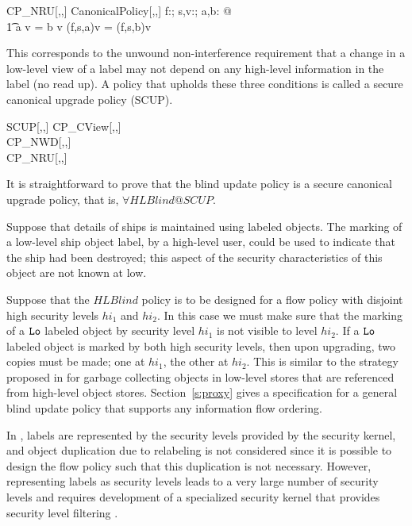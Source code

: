 \begin{schema}{CP\_NRU[\LEVEL,\LABEL,\FID]}
CanonicalPolicy[\LEVEL,\LABEL,\FID]
\where
\forall f:\FID ; s,v:\LEVEL; a,b: \LABEL @\\
\t1 a \lproj v = b \lproj v \implies \Rfun(f,s,a)\lproj v = \Rfun(f,s,b)\lproj v
\end{schema}
This corresponds to the unwound non-interference requirement
that a change in a low-level view of a label may not depend on 
any high-level information in the label (no read up). 
A policy that upholds these three conditions is called
a secure canonical upgrade policy (SCUP).
\begin{schema}{SCUP[\LEVEL,\LABEL,\FID]}
CP\_CView[\LEVEL,\LABEL,\FID]\\
CP\_NWD[\LEVEL,\LABEL,\FID] \\
CP\_NRU[\LEVEL,\LABEL,\FID]
\end{schema}

\begin{ex}
It is straightforward to prove that the blind update policy is a
secure canonical upgrade policy, that is, 
$\forall HLBlind @ SCUP$. 
\end{ex}

\begin{ex}
Suppose that details of ships is maintained using labeled objects.  The
marking of a low-level ship object label, by a high-level user, could
be used to indicate that the ship had been destroyed; this aspect of
the security characteristics of this object are not known at low.
\end{ex}

\begin{ex} \label{x:hihi}
Suppose that the $HLBlind$ policy is to be designed for a flow
policy with disjoint high security levels $hi_{1}$ and $hi_{2}$.  In this case
we must make sure that the marking of a $\mbox{\tt Lo}$ labeled object by security level 
$hi_{1}$ is not visible to level $hi_{2}$.  If a $\mbox{\tt Lo}$ labeled object is marked by both high security levels,
then upon upgrading, two copies must be made; one at $hi_1$, the other
at $hi_2$. This is similar to the strategy proposed in
\cite{Bertino:94} for garbage collecting objects in low-level stores that are
referenced from high-level object stores.  Section~\ref{s:proxy} gives a
specification for a general blind update policy that supports any
information flow ordering.

In \cite{FGQ:oak:96}, labels are represented by the security levels
provided by the security kernel, and object duplication due to
relabeling is not considered since it is possible to design the flow
policy such that this duplication is not necessary.  However,
representing labels as security levels  
leads to a very large number of
security levels and requires development of a specialized security
kernel that provides security level filtering \cite{FGQ:oak:96}.
\end{ex}




